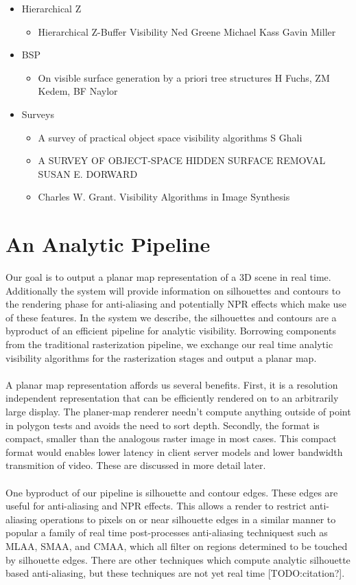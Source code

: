 \documentclass[review]{acmsiggraph}
\begin{document}
\begin{itemize}
\item Hierarchical Z
\begin{itemize}
\item Hierarchical Z-Buffer Visibility Ned Greene Michael Kass Gavin Miller
\end{itemize}
\item BSP
\begin{itemize}
\item On visible surface generation by a priori tree structures H Fuchs, ZM Kedem, BF Naylor
\end{itemize}
\item Surveys
\begin{itemize}
\item A survey of practical object space visibility algorithms  S Ghali
\item A SURVEY OF OBJECT-SPACE HIDDEN SURFACE REMOVAL SUSAN E. DORWARD
\item Charles W. Grant. Visibility Algorithms in Image Synthesis
\end{itemize}
\end{itemize}

\section{An Analytic Pipeline}
Our goal is to output a planar map representation of a 3D scene in real time. Additionally the system will provide information on silhouettes and contours to the rendering phase for anti-aliasing and potentially NPR effects which make use of these features. In the system we describe, the silhouettes and contours are a byproduct of an efficient pipeline for analytic visibility. Borrowing components from the traditional rasterization pipeline, we exchange our real time analytic visibility algorithms for the rasterization stages and output a planar map. 
\\\\
A planar map representation affords us several benefits. First, it is a resolution independent representation that can be efficiently rendered on to an arbitrarily large display. The planer-map renderer needn’t compute anything outside of point in polygon tests and avoids the need to sort depth. Secondly, the format is compact, smaller than the analogous raster image in most cases. This compact format would enables lower latency in client server models and lower bandwidth transmition of video.  These are discussed in more detail later. 
\\\\
One byproduct of our pipeline is silhouette and contour edges. These edges are useful for anti-aliasing and NPR effects. This allows a render to restrict anti-aliasing operations to pixels on or near silhouette edges in a similar manner to popular a family of real time post-processes anti-aliasing techniquest such as MLAA, SMAA, and CMAA, which all filter on regions determined to be touched by silhouette edges. There are other techniques which compute analytic silhouette based anti-aliasing, but these techniques are not yet real time [TODO:citation?].
\end{document}
